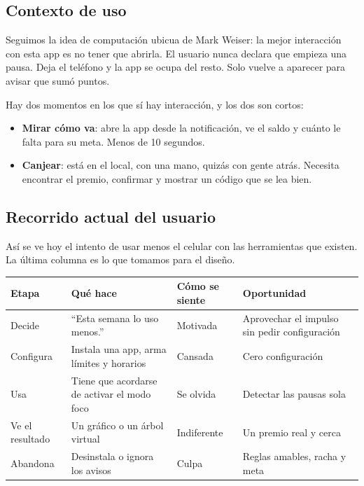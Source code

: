 \subsection{Contexto de uso}

Seguimos la idea de computación ubicua de Mark Weiser: la mejor interacción con esta app es no tener que abrirla. El usuario nunca declara que empieza una pausa. Deja el teléfono y la app se ocupa del resto. Solo vuelve a aparecer para avisar que sumó puntos.

Hay dos momentos en los que sí hay interacción, y los dos son cortos:
\begin{itemize}
\item \textbf{Mirar cómo va}: abre la app desde la notificación, ve el saldo y cuánto le falta para su meta. Menos de 10 segundos.
\item \textbf{Canjear}: está en el local, con una mano, quizás con gente atrás. Necesita encontrar el premio, confirmar y mostrar un código que se lea bien.
\end{itemize}

\subsection{Recorrido actual del usuario}

Así se ve hoy el intento de usar menos el celular con las herramientas que existen. La última columna es lo que tomamos para el diseño.

\begin{table}[H]
\centering\small
\begin{tabularx}{\textwidth}{@{}l L l L@{}}
\toprule
\textbf{Etapa} & \textbf{Qué hace} & \textbf{Cómo se siente} & \textbf{Oportunidad} \\
\midrule
Decide    & “Esta semana lo uso menos.” & Motivada & Aprovechar el impulso sin pedir configuración \\
Configura & Instala una app, arma límites y horarios & Cansada & Cero configuración \\
Usa       & Tiene que acordarse de activar el modo foco & Se olvida & Detectar las pausas sola \\
Ve el resultado & Un gráfico o un árbol virtual & Indiferente & Un premio real y cerca \\
Abandona  & Desinstala o ignora los avisos & Culpa & Reglas amables, racha y meta \\
\bottomrule
\end{tabularx}
\end{table}
